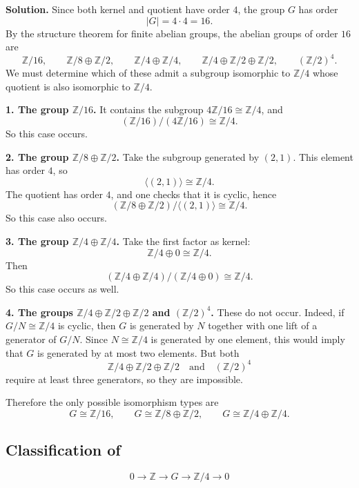 \documentclass[12pt,a4paper]{article}
\theoremstyle{notespace}
\begin{document}
\noindent\textbf{Solution.}
Since both kernel and quotient have order \(4\), the group \(G\) has order
\[
|G|=4\cdot 4=16.
\]
By the structure theorem for finite abelian groups, the abelian groups of order \(16\) are
\[
\mathbb Z/16,\qquad
\mathbb Z/8\oplus \mathbb Z/2,\qquad
\mathbb Z/4\oplus \mathbb Z/4,\qquad
\mathbb Z/4\oplus \mathbb Z/2\oplus \mathbb Z/2,\qquad
(\mathbb Z/2)^4.
\]
We must determine which of these admit a subgroup isomorphic to \(\mathbb Z/4\) whose quotient is also isomorphic to \(\mathbb Z/4\).

\medskip

\noindent
\textbf{1. The group \(\mathbb Z/16\).}
It contains the subgroup \(4\mathbb Z/16\cong \mathbb Z/4\), and
\[
(\mathbb Z/16)/(4\mathbb Z/16)\cong \mathbb Z/4.
\]
So this case occurs.

\medskip

\noindent
\textbf{2. The group \(\mathbb Z/8\oplus \mathbb Z/2\).}
Take the subgroup generated by \((2,1)\). This element has order \(4\), so
\[
\langle (2,1)\rangle \cong \mathbb Z/4.
\]
The quotient has order \(4\), and one checks that it is cyclic, hence
\[
(\mathbb Z/8\oplus \mathbb Z/2)/\langle (2,1)\rangle \cong \mathbb Z/4.
\]
So this case also occurs.

\medskip

\noindent
\textbf{3. The group \(\mathbb Z/4\oplus \mathbb Z/4\).}
Take the first factor as kernel:
\[
\mathbb Z/4\oplus 0 \cong \mathbb Z/4.
\]
Then
\[
(\mathbb Z/4\oplus \mathbb Z/4)/(\mathbb Z/4\oplus 0)\cong \mathbb Z/4.
\]
So this case occurs as well.

\medskip

\noindent
\textbf{4. The groups \(\mathbb Z/4\oplus \mathbb Z/2\oplus \mathbb Z/2\) and \((\mathbb Z/2)^4\).}
These do not occur. Indeed, if \(G/N\cong \mathbb Z/4\) is cyclic, then \(G\) is generated by \(N\) together with one lift of a generator of \(G/N\). Since \(N\cong \mathbb Z/4\) is generated by one element, this would imply that \(G\) is generated by at most two elements. But both
\[
\mathbb Z/4\oplus \mathbb Z/2\oplus \mathbb Z/2
\quad \text{and} \quad
(\mathbb Z/2)^4
\]
require at least three generators, so they are impossible.

Therefore the only possible isomorphism types are
\[
\boxed{
	G\cong \mathbb Z/16,
	\qquad
	G\cong \mathbb Z/8\oplus \mathbb Z/2,
	\qquad
	G\cong \mathbb Z/4\oplus \mathbb Z/4.
}
\]

\subsection{Classification of}
\[
0\longrightarrow \mathbb Z \longrightarrow G \longrightarrow \mathbb Z/4 \longrightarrow 0
\]
\end{document}
